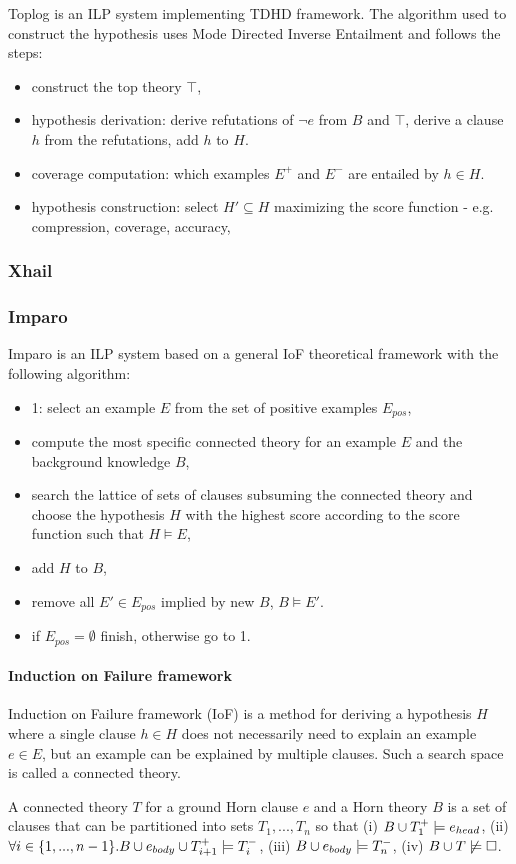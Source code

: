 Toplog is an ILP system implementing TDHD framework. The algorithm used to construct the hypothesis uses Mode Directed Inverse Entailment and follows the steps:
\begin{itemize}
\item construct the top theory $\top$,
\item hypothesis derivation: derive refutations of $\neg e$ from $B$ and $\top$, derive a clause $h$ from the refutations, add $h$ to $H$.
\item coverage computation: which examples $E^+$ and $E^-$ are entailed by $h \in H$.
\item hypothesis construction: select $H' \subseteq H$ maximizing the score function - e.g. compression, coverage, accuracy,
\end{itemize}


\subsubsection{Xhail}

\subsubsection{Imparo}
Imparo is an ILP system based on a general IoF theoretical framework with the following algorithm:
\begin{itemize}
\item 1: select an example $E$ from the set of positive examples $E_{pos}$,
\item compute the most specific connected theory for an example $E$ and the background knowledge $B$,
\item search the lattice of sets of clauses subsuming the connected theory and choose the hypothesis $H$ with the highest score according to the score function such that $H \models E$,
\item add $H$ to $B$,
\item remove all $E' \in E_{pos}$ implied by new $B$, $B \models E'$.
\item if $E_{pos} = \emptyset$ finish, otherwise go to 1.
\end{itemize}

\paragraph{Induction on Failure framework\cite{kimber2012learning}}
Induction on Failure framework (IoF) is a method for deriving a hypothesis $H$ where a single clause $h \in H$ does not necessarily need to explain an example $e \in E$, but an example can be explained by multiple clauses. Such a search space is called a connected theory.
\begin{defn}
A connected theory $T$ for a ground Horn clause $e$ and a Horn theory $B$ is a set of clauses that can be partitioned into sets $T_1, ..., T_n$ so that
(i) $B \cup T_1^+ \models e_{head}$,
(ii) $\forall i \in \{1, ..., n-1\}. B \cup e_{body} \cup T_{i+1}^+ \models T_i^-$,
(iii) $B \cup e_{body} \models T_n^-$,
(iv) $B \cup T \not\models \square$.
\end{defn}

